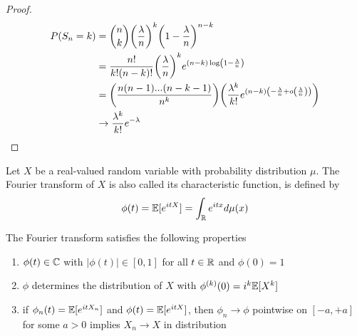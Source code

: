 \documentclass{report}
\begin{document}
\begin{proof}
    \begin{align*}
        P(S_n = k)
        &= {n \choose k} \tuple*{\frac{\lambda}{n}}^k \tuple*{1 - \frac{\lambda}{n}}^{n-k} \\
        &= \frac{n!}{k!(n-k)!} \tuple*{\frac{\lambda}{n}}^k e^{(n-k)\log \tuple*{1 - \frac{\lambda}{n}}} \\
        &= \tuple*{\frac{n(n-1)...(n-k-1)}{n^k}} \tuple*{\frac{\lambda^k}{k!} e^{(n-k)\tuple*{-\frac{\lambda}{n} + o\tuple*{\frac{\lambda}{n}}}}} \\
        &\to \frac{\lambda^k}{k!} e^{-\lambda}
    \end{align*}
\end{proof}

\begin{definition}
    Let $X$ be a real-valued random variable with probability distribution $\mu$. The Fourier transform of $X$ is also called its characteristic function, is defined by
    $$
        \phi(t) = \mathbb{E}[e^{itX}] = \int_{\mathbb{R}} e^{itx} d \mu(x)
    $$
\end{definition}

\begin{theorem}
    The Fourier transform satisfies the following properties
    \begin{enumerate}
        \item $\phi(t) \in \mathbb{C}$ with $|\phi(t)| \in [0, 1]$ for all $t \in \mathbb{R}$ and $\phi(0) = 1$

        \item $\phi$ determines the distribution of $X$ with $\phi^{(k)}(0) = i^k \mathbb{E}[X^k]$

        \item if $\phi_n(t) = \mathbb{E}[e^{it X_n}]$ and $\phi(t) = \mathbb{E}[e^{itX}]$, then $\phi_n \to \phi$ pointwise on $[-a, +a]$ for some $a > 0$ implies $X_n \to X$ in distribution
    \end{enumerate}
\end{theorem}
\end{document}
